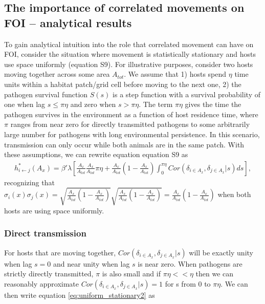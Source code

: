 \documentclass[letterpaper]{article}
\begin{document}
\subsection*{The importance of correlated movements on FOI -- analytical results}

To gain analytical intuition into the role that correlated movement can have on FOI, consider the situation where movement is statistically stationary and hosts use space uniformly (equation S9). 
For illustrative purposes, consider two hosts moving together across some area $A_{tot}$. We assume that 1) hosts spend $\eta$ time units within a habitat patch/grid cell before moving to the next one, 2) the pathogen survival function $S(s)$ is a step function with a survival probability of one when lag $s \leq \pi \eta$ and zero when $s > \pi \eta$.  
The term $\pi \eta$ gives the time the pathogen survives in the environment as a function of host residence time, where $\pi$ ranges from near zero for directly transmitted pathogens to some arbitrarily large number for pathogens with long environmental persistence.  
In this scenario, transmission can only occur while both animals are in the same patch. With these assumptions, we can rewrite equation equation S9 as 
\begin{equation}
    \begin{aligned}
        h^*_{i \leftarrow j}(A_x) = \beta' \lambda \left[\frac{A_x}{A_{tot}}\frac{A_x}{A_{tot}} \pi \eta + \frac{A_x}{A_{tot}}(1 - \frac{A_x}{A_{tot}}) \int_{0}^{\pi \eta} Cor(\delta_{i \in A_x}, \delta_{j \in A_x} | s) ds\right],
    \end{aligned}
    \label{eq:uniform_stationary2}
\end{equation}
recognizing that $\sigma_i(x) \sigma_j(x) = \sqrt{\frac{A_x}{A_{tot}}(1 - \frac{A_x}{A_{tot}})}\sqrt{\frac{A_x}{A_{tot}}(1 - \frac{A_x}{A_{tot}})} = \frac{A_x}{A_{tot}}(1 - \frac{A_x}{A_{tot}})$ when both hosts are using space uniformly.

\subsubsection*{Direct transmission}

For hosts that are moving together, $Cor(\delta_{i \in A_x}, \delta_{j \in A_x} | s)$ will be exactly unity when lag $s = 0$ and near unity when lag $s$ is near zero. When pathogens are strictly directly transmitted, $\pi$ is also small and if $\pi \eta << \eta$ then we can reasonably approximate $Cor(\delta_{i \in A_x}, \delta_{j \in A_x} | s) = 1$ for s from 0 to $\pi \eta$.  We can then write equation \ref{eq:uniform_stationary2} as 
\end{document}
